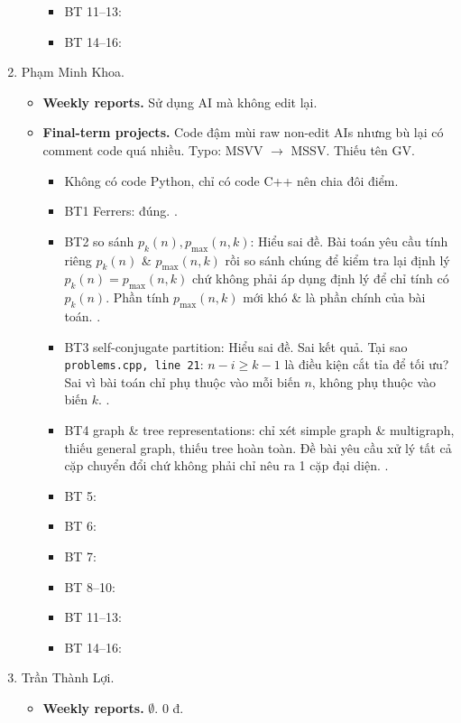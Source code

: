 \documentclass{article}
\begin{document}
\begin{enumerate}
\begin{itemize}
\begin{itemize}
            \item BT 11--13:
            \item BT 14--16:
        \end{itemize}
    \end{itemize}
    \item {\sc Phạm Minh Khoa.}
    \begin{itemize}
        \item {\bf Weekly reports.} Sử dụng AI mà không  edit lại.
        \item {\bf Final-term projects.} Code đậm mùi raw non-edit AIs nhưng bù lại có comment code quá nhiều. Typo: MSVV $\to$ MSSV. Thiếu tên GV.
        \begin{itemize}
            \item Không có code Python, chỉ có code C++ nên chia đôi điểm.
            \item BT1 Ferrers: đúng. .
            \item BT2 so sánh $p_k(n),p_{\max}(n,k)$: Hiểu sai đề. Bài toán yêu cầu tính riêng $p_k(n)$ \& $p_{\max}(n,k)$ rồi so sánh chúng để kiểm tra lại định lý $p_k(n) = p_{\max}(n,k)$ chứ không phải áp dụng định lý để chỉ tính có $p_k(n)$. Phần tính $p_{\max}(n,k)$ mới khó \& là phần chính  của bài toán. .
            \item BT3 self-conjugate partition: Hiểu sai đề. Sai kết quả. Tại sao {\tt problems.cpp, line 21}: $n - i\ge k - 1$ là điều kiện cắt tỉa để tối ưu? Sai vì bài toán chỉ phụ thuộc vào mỗi biến $n$, không phụ thuộc vào biến $k$. .
            \item BT4 graph \& tree representations: chỉ xét simple graph \& multigraph, thiếu general graph, thiếu tree hoàn toàn. Đề bài yêu cầu xử lý tất cả cặp chuyển đổi chứ không phải chỉ nêu ra 1 cặp đại diện. .
            \item BT 5:
            \item BT 6:
            \item BT 7:
            \item BT 8--10:
            \item BT 11--13:
            \item BT 14--16:
        \end{itemize}
    \end{itemize}
    \item {\sc Trần Thành Lợi.}
    \begin{itemize}
        \item {\bf Weekly reports.} $\emptyset$. 0 đ.

\end{itemize}
\end{enumerate}
\end{document}
